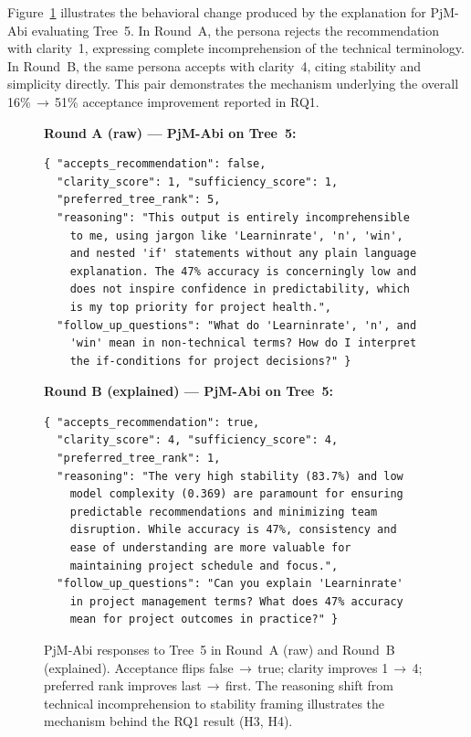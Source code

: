 \documentclass[sigconf,review]{acmart}
\begin{document}
Figure~\ref{fig:responses} illustrates the behavioral change produced by
the explanation for PjM-Abi evaluating Tree~5. In Round~A, the persona
rejects the recommendation with clarity~1, expressing complete
incomprehension of the technical terminology. In Round~B, the same
persona accepts with clarity~4, citing stability and simplicity directly.
This pair demonstrates the mechanism underlying the overall
16\%\,$\rightarrow$\,51\% acceptance improvement reported in RQ1.

\begin{figure}[ht]
\begin{mdframed}[backgroundcolor=boxgray, linecolor=boxborder,
                 linewidth=0.8pt, innerleftmargin=6pt,
                 innerrightmargin=6pt, innertopmargin=5pt,
                 innerbottommargin=5pt]
\small
\textbf{Round A (raw) --- PjM-Abi on Tree~5:}
\begin{lstlisting}
{ "accepts_recommendation": false,
  "clarity_score": 1, "sufficiency_score": 1,
  "preferred_tree_rank": 5,
  "reasoning": "This output is entirely incomprehensible
    to me, using jargon like 'Learninrate', 'n', 'win',
    and nested 'if' statements without any plain language
    explanation. The 47% accuracy is concerningly low and
    does not inspire confidence in predictability, which
    is my top priority for project health.",
  "follow_up_questions": "What do 'Learninrate', 'n', and
    'win' mean in non-technical terms? How do I interpret
    the if-conditions for project decisions?" }
\end{lstlisting}
\vspace{3pt}
\textbf{Round B (explained) --- PjM-Abi on Tree~5:}
\begin{lstlisting}
{ "accepts_recommendation": true,
  "clarity_score": 4, "sufficiency_score": 4,
  "preferred_tree_rank": 1,
  "reasoning": "The very high stability (83.7%) and low
    model complexity (0.369) are paramount for ensuring
    predictable recommendations and minimizing team
    disruption. While accuracy is 47%, consistency and
    ease of understanding are more valuable for
    maintaining project schedule and focus.",
  "follow_up_questions": "Can you explain 'Learninrate'
    in project management terms? What does 47% accuracy
    mean for project outcomes in practice?" }
\end{lstlisting}
\end{mdframed}
\caption{PjM-Abi responses to Tree~5 in Round~A (raw) and Round~B
         (explained). Acceptance flips false\,$\to$\,true; clarity
         improves 1\,$\to$\,4; preferred rank improves
         last\,$\to$\,first. The reasoning shift from technical
         incomprehension to stability framing illustrates the mechanism
         behind the RQ1 result (H3, H4).}
\label{fig:responses}
\end{figure}
\end{document}

